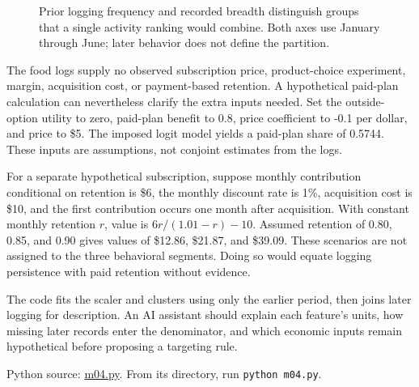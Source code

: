 \begin{figure}[htbp]
\centering

\caption{Prior logging frequency and recorded breadth distinguish groups that a single activity ranking would combine. Both axes use January through June; later behavior does not define the partition.}\label{fig:M04_mhealth_segments}
\end{figure}

The food logs supply no observed subscription price, product-choice
experiment, margin, acquisition cost, or payment-based retention. A
hypothetical paid-plan calculation can nevertheless clarify the extra
inputs needed. Set the outside-option utility to zero, paid-plan benefit
to 0.8, price coefficient to -0.1 per dollar, and price to \$5. The
imposed logit model yields a paid-plan share of 0.5744. These inputs are
assumptions, not conjoint estimates from the logs.

For a separate hypothetical subscription, suppose monthly contribution
conditional on retention is \$6, the monthly discount rate is 1\%,
acquisition cost is \$10, and the first contribution occurs one month
after acquisition. With constant monthly retention \(r\), value is
\(6r/(1.01-r)-10\). Assumed retention of 0.80, 0.85, and 0.90 gives
values of \$12.86, \$21.87, and \$39.09. These scenarios are not
assigned to the three behavioral segments. Doing so would equate logging
persistence with paid retention without evidence.

The code fits the scaler and clusters using only the earlier period,
then joins later logging for description. An AI assistant should explain
each feature's units, how missing later records enter the denominator,
and which economic inputs remain hypothetical before proposing a
targeting rule.

\FloatBarrier
{}
Python source:
\href{../03_Data_and_Code/mHealth/recurring_examples/m04.py}{m04.py}.
From its directory, run \texttt{python\ m04.py}.

